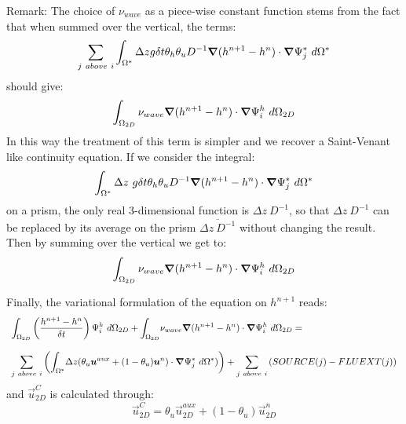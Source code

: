 \begin{CommentBlock}{Remark:}
The choice of $\nu_{wave}$ as a piece-wise constant function stems
from the fact that when summed over the vertical, the terms:%
\begin{equation}
\sum_{j~above~i}\int_{\Omega^{\ast}}\Delta zg\delta t
\theta_{h}\theta_{u}D^{-1}\bm{\nabla}(h^{n+1}-h^{n})\cdot\bm{\nabla}\Psi_{j}^*~d\Omega^{\ast}
\end{equation}
should give:
\begin{equation}
\int_{\Omega_{2D}}\nu_{wave}\bm{\nabla}(h^{n+1}-h^{n})\cdot\bm{\nabla}\Psi_{i}^{h}~d\Omega_{2D}
\end{equation}
In this way the treatment of this term is simpler and we
recover a Saint-Venant like continuity equation.
If we consider the integral:
\begin{equation}
\int_{\Omega^{\ast}}\Delta z~g\delta t\theta_{h}\theta_{u}D^{-1}\bm{\nabla}(h^{n+1}-h^{n})
\cdot\bm{\nabla}\Psi_{j}^{*}~d\Omega^{\ast}
\end{equation}
on a prism, the only real 3-dimensional function is $\Delta z~D^{-1}$, so that
$\Delta z~D^{-1}$ can be replaced by its average on the prism $\overline
{\Delta z~D^{-1}}$ without changing the result. Then by summing over the
vertical we get to:
\begin{equation}
\int_{\Omega_{2D}}\nu_{wave}\bm{\nabla}(h^{n+1}-h^{n})\cdot\bm{\nabla}\Psi_{i}^{h}~d\Omega_{2D}
\end{equation}
\end{CommentBlock}


Finally, the variational formulation of the equation on $h^{n+1}$ reads:%
\begin{equation}
\begin{array}{l}
\displaystyle{\int_{\Omega_{2D}}}\left(\dfrac{h^{n+1}-h^{n}}{\delta t}\right)\Psi_{i}^{h}~d\Omega_{2D}
+\displaystyle{\int_{\Omega_{2D}}}\nu_{wave}\Grad(h^{n+1}-h^{n})\cdot\Grad\Psi_{i}^{h}~d\Omega_{2D}=\bigskip\\
\displaystyle{\sum_{j~above~i}}\left(\displaystyle{\int_{\Omega^{\ast}}}
\Delta z (\theta_{u}\vec{u}^{aux}+(1-\theta_{u})\vec{u}^{n})\cdot\Grad\Psi_{j}^{*}~d\Omega^{\ast})\right)
+\displaystyle{\sum_{j~above~i}}\left(  SOURCE(j)-FLUEXT(j)\right)
\end{array}
\label{contiwave}%
\end{equation}
and $\vec{u}_{2D}^{C}$ is calculated through:
\begin{equation}
\vec{u}_{2D}^{C}=\theta_u\vec{u}_{2D}^{aux}+(1-\theta_u)\vec{u}_{2D}^n
\label{eq:ucfinal}
\end{equation}

